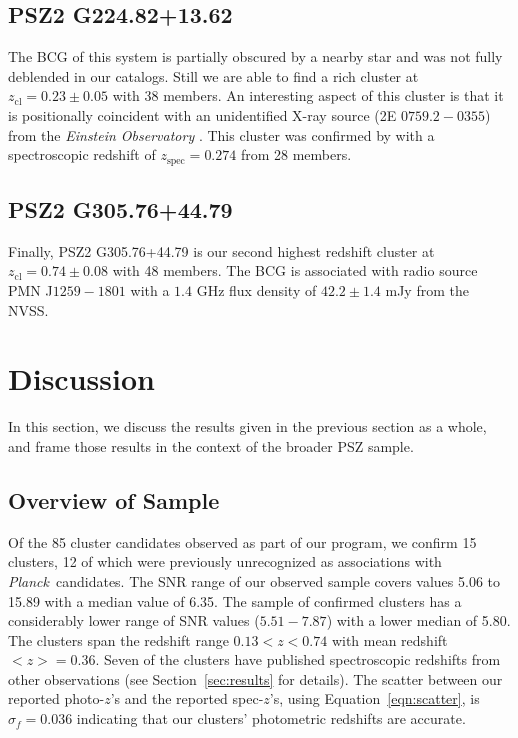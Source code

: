 \documentclass[apj, revtex4-1]{emulateapj}
\newcommand{\planck}{\textit{Planck}}
\begin{document}
\subsection{PSZ2 G224.82+13.62} %
The BCG of this system is partially obscured by a nearby star and was not fully deblended in our catalogs. Still we are able to find a rich cluster at $z_\mathrm{cl} = 0.23 \pm 0.05$ with 38 members. An interesting aspect of this cluster is that it is positionally coincident with an unidentified X-ray source (2E $0759.2-0355$) from the \textit{Einstein Observatory} \citep{Harris1990}. This cluster was confirmed by \cite{Barrena2018} with a spectroscopic redshift of $z_\mathrm{spec} = 0.274$ from 28 members.

\subsection{PSZ2 G305.76+44.79} %
Finally, PSZ2 G305.76+44.79 is our second highest redshift cluster at $z_\mathrm{cl} = 0.74 \pm 0.08$ with 48 members. The BCG is associated with radio source PMN J$1259-1801$ with a $1.4$ GHz flux density of $42.2\pm 1.4$ mJy from the NVSS.


\section{Discussion}\label{sec:discussion}
In this section, we discuss the results given in the previous section as a whole, and frame those results in the context of the broader PSZ sample.

\subsection{Overview of Sample}
Of the 85 cluster candidates observed as part of our program, we confirm 15 clusters, 12 of which were previously unrecognized as associations with \planck\ candidates. The SNR range of our observed sample covers values 5.06 to 15.89 with a median value of 6.35. The sample of confirmed clusters has a considerably lower range of SNR values ($5.51 - 7.87$) with a lower median of 5.80. The clusters span the redshift range $ 0.13 < z < 0.74$ with mean redshift $<z> = 0.36$. Seven of the clusters have published spectroscopic redshifts from other observations (see Section~\ref{sec:results} for details). The scatter between our reported photo-$z$'s and the reported spec-$z$'s, using Equation~\ref{eqn:scatter}, is $\sigma_f = 0.036$ indicating that our clusters' photometric redshifts are accurate.
\end{document}

